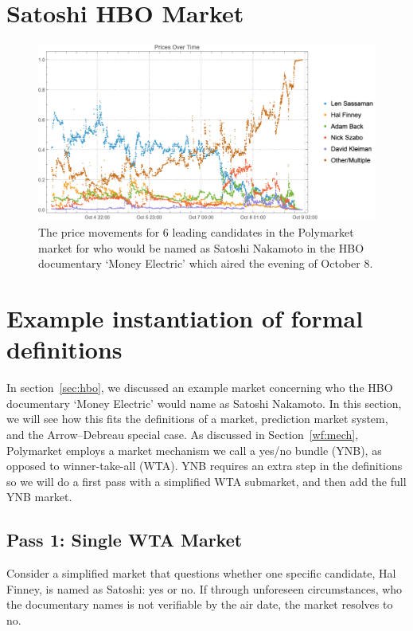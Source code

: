 \section{Satoshi HBO Market}
\label{app:hbo}

\begin{figure}
  \centering
  \includegraphics[width=\textwidth]{figures/graph.png}
  \caption{The price movements for 6 leading candidates in the Polymarket market for who would be named as Satoshi Nakamoto in the HBO documentary `Money Electric' which aired the evening of October 8.}
  \label{fig:example}
\end{figure}

\section{Example instantiation of formal definitions}
\label{app:example}

In section~\ref{sec:hbo}, we discussed an example market concerning who the HBO documentary `Money Electric' would name as Satoshi Nakamoto. In this section, we will see how this fits the definitions of a market, prediction market system, and the Arrow--Debreau special case. As discussed in Section~\ref{wf:mech}, Polymarket employs a market mechanism we call a yes/no bundle (YNB), as opposed to winner-take-all (WTA). YNB requires an extra step in the definitions so we will do a first pass with a simplified WTA submarket, and then add the full YNB market.

\subsection{Pass 1: Single WTA Market}

Consider a simplified market that questions whether one specific candidate, \eg Hal Finney, is named as Satoshi: yes or no. If through unforeseen circumstances, who the documentary names is not verifiable by the air date, the market resolves to no.

